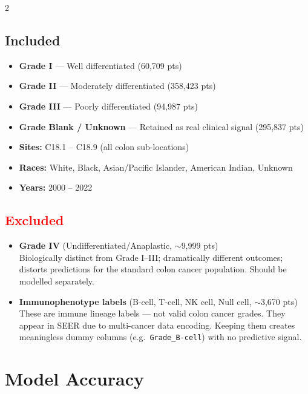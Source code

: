 \documentclass[11pt, a4paper]{article}
\begin{document}
\begin{multicols}{2}

\subsection*{\textcolor{successgreen}{Included}}
\begin{itemize}
  \item \textbf{Grade I} — Well differentiated (60,709 pts)
  \item \textbf{Grade II} — Moderately differentiated (358,423 pts)
  \item \textbf{Grade III} — Poorly differentiated (94,987 pts)
  \item \textbf{Grade Blank / Unknown} — Retained as real clinical signal (295,837 pts)
  \item \textbf{Sites:} C18.1 – C18.9 (all colon sub-locations)
  \item \textbf{Races:} White, Black, Asian/Pacific Islander, American Indian, Unknown
  \item \textbf{Years:} 2000 – 2022
\end{itemize}

\columnbreak

\subsection*{\textcolor{red}{Excluded}}
\begin{itemize}
  \item \textbf{Grade IV} (Undifferentiated/Anaplastic, $\sim$9,999 pts)\\
  {\footnotesize Biologically distinct from Grade I–III; dramatically different
  outcomes; distorts predictions for the standard colon cancer population.
  Should be modelled separately.}

  \item \textbf{Immunophenotype labels} (B-cell, T-cell, NK cell, Null cell, $\sim$3,670 pts)\\
  {\footnotesize These are immune lineage labels — not valid colon cancer grades.
  They appear in SEER due to multi-cancer data encoding. Keeping them creates
  meaningless dummy columns (e.g.\ \texttt{Grade\_B-cell}) with no predictive signal.}
\end{itemize}
\end{multicols}

\section{Model Accuracy}
\end{document}
